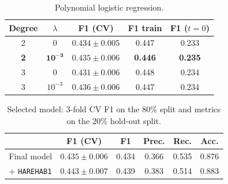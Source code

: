 \begin{table}[htbp]
\centering
\caption{Polynomial logistic regression.}
\label{tab:polynomial}
\begin{tabular}{ccccc}
\hline
Degree & $\lambda$ & F1 (CV) & F1 train & F1 ($t=0$) \\
\hline
2 & $0$ & $0.434 \pm 0.005$ & 0.447 & 0.233 \\
\textbf{2} & $\mathbf{10^{-3}}$ & $\mathbf{0.435 \pm 0.006}$ & \textbf{0.446} & \textbf{0.235} \\
3 & $0$ & $0.431 \pm 0.006$ & 0.448 & 0.234 \\
3 & $10^{-3}$ & $0.436 \pm 0.006$ & 0.447 & 0.234 \\
\hline
\end{tabular}
\end{table}

\begin{table}[htbp]
\centering
\caption{Selected model: 3-fold CV F1 on the 80\% split and metrics on the 20\% hold-out split.}
\label{tab:eval}
\begin{tabular}{lccccc}
\hline
 & F1 (CV) & F1 & Prec. & Rec. & Acc. \\
\hline
Final model & $0.435 \pm 0.006$ & 0.434 & 0.366 & 0.535 & 0.876 \\
+ \texttt{HAREHAB1} & $0.443 \pm 0.007$ & 0.439 & 0.383 & 0.514 & 0.883 \\
\hline
\end{tabular}
\end{table}
